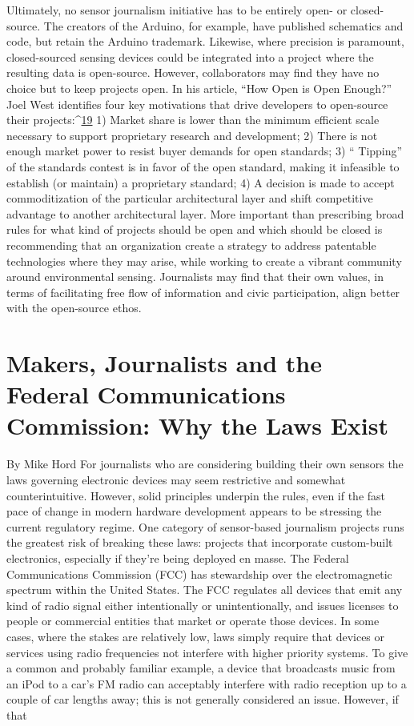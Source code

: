 Ultimately, no sensor journalism initiative has to be entirely open- or
closed-source. The creators of the Arduino, for example, have published
schematics and code, but retain the Arduino trademark. Likewise, where
precision is paramount, closed-sourced sensing devices could be integrated
into a project where the resulting data is open-source. However, collaborators
may find they have no choice but to keep projects open. In his article,
``How Open is Open Enough?'' Joel West identifies four key motivations that
drive developers to open-source their projects:^{\href{#endnotes-schroyer}{19}}
1) Market share is lower than the minimum efficient scale necessary
to support proprietary research and development;
2) There is not enough market power to resist buyer demands for
open standards;
3) `` Tipping'' of the standards contest is in favor of the open
standard, making it infeasible to establish (or maintain) a
proprietary standard;
4) A decision is made to accept commoditization of the particular
architectural layer and shift competitive advantage to another
architectural layer.
More important than prescribing broad rules for what kind of projects
should be open and which should be closed is recommending that an organization
create a strategy to address patentable technologies where they
may arise, while working to create a vibrant community around environmental
sensing. Journalists may find that their own values, in terms of facilitating
free flow of information and civic participation, align better with the
open-source ethos.

\section{Makers, Journalists and the Federal Communications Commission: Why the Laws Exist}
By Mike Hord
For journalists who are considering building their own sensors the laws
governing electronic devices may seem restrictive and somewhat counterintuitive.
However, solid principles underpin the rules, even if the fast pace
of change in modern hardware development appears to be stressing the
current regulatory regime.
One category of sensor-based journalism projects runs the greatest risk
of breaking these laws: projects that incorporate custom-built electronics,
especially if they're being deployed en masse.
The Federal Communications Commission (FCC) has stewardship over the
electromagnetic spectrum within the United States. The FCC regulates all
devices that emit any kind of radio signal either intentionally or unintentionally,
and issues licenses to people or commercial entities that market
or operate those devices. In some cases, where the stakes are relatively
low, laws simply require that devices or services using radio frequencies
not interfere with higher priority systems. To give a common and probably
familiar example, a device that broadcasts music from an iPod to a car's
FM radio can acceptably interfere with radio reception up to a couple of
car lengths away; this is not generally considered an issue. However, if that

